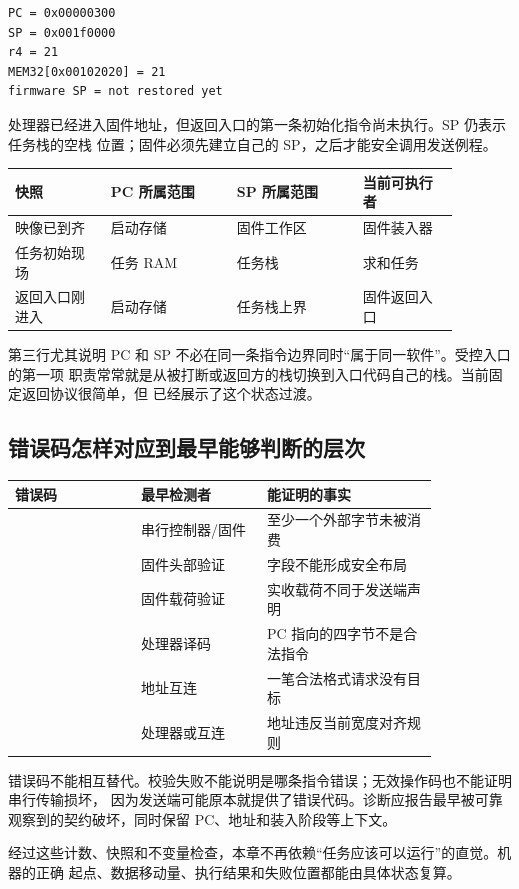 \begin{lstlisting}
PC = 0x00000300
SP = 0x001f0000
r4 = 21
MEM32[0x00102020] = 21
firmware SP = not restored yet
\end{lstlisting}

处理器已经进入固件地址，但返回入口的第一条初始化指令尚未执行。SP 仍表示任务栈的空栈
位置；固件必须先建立自己的 SP，之后才能安全调用发送例程。

\begin{longtable}{|L{0.19\linewidth}|L{0.25\linewidth}|L{0.25\linewidth}|L{0.19\linewidth}|}
\hline
{}
快照 & PC 所属范围 & SP 所属范围 & 当前可执行者 \\ \hline
映像已到齐 & 启动存储 & 固件工作区 & 固件装入器 \\ \hline
任务初始现场 & 任务 RAM & 任务栈 & 求和任务 \\ \hline
返回入口刚进入 & 启动存储 & 任务栈上界 & 固件返回入口 \\ \hline
\end{longtable}

第三行尤其说明 PC 和 SP 不必在同一条指令边界同时“属于同一软件”。受控入口的第一项
职责常常就是从被打断或返回方的栈切换到入口代码自己的栈。当前固定返回协议很简单，但
已经展示了这个状态过渡。

\subsection{错误码怎样对应到最早能够判断的层次}

\begin{longtable}{|L{0.25\linewidth}|L{0.25\linewidth}|L{0.34\linewidth}|}
\hline
{}
错误码 & 最早检测者 & 能证明的事实 \\ \hline
{} & 串行控制器/固件 & 至少一个外部字节未被消费 \\ \hline
{} & 固件头部验证 & 字段不能形成安全布局 \\ \hline
{} & 固件载荷验证 & 实收载荷不同于发送端声明 \\ \hline
{} & 处理器译码 & PC 指向的四字节不是合法指令 \\ \hline
{} & 地址互连 & 一笔合法格式请求没有目标 \\ \hline
{} & 处理器或互连 & 地址违反当前宽度对齐规则 \\ \hline
\end{longtable}

错误码不能相互替代。校验失败不能说明是哪条指令错误；无效操作码也不能证明串行传输损坏，
因为发送端可能原本就提供了错误代码。诊断应报告最早被可靠观察到的契约破坏，同时保留
PC、地址和装入阶段等上下文。

经过这些计数、快照和不变量检查，本章不再依赖“任务应该可以运行”的直觉。机器的正确
起点、数据移动量、执行结果和失败位置都能由具体状态复算。
